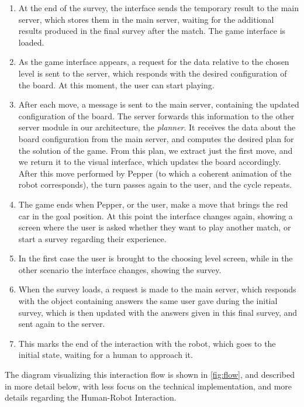 \documentclass{article}
\begin{document}
\begin{enumerate}
    \item At the end of the survey, the interface sends the temporary result to the main server, which stores them in the main server, waiting for the additional results produced in the final survey after the match. The game interface is loaded.
    \item As the game interface appears, a request for the data relative to the chosen level is sent to the server, which responds with the desired configuration of the board. At this moment, the user can start playing.
    \item After each move, a message is sent to the main server, containing the updated configuration of the board. The server forwards this information to the other server module in our architecture, the \textit{planner}. It receives the data about the board configuration from the main server, and computes the desired plan for the solution of the game. From this plan, we extract just the first move, and we return it to the visual interface, which updates the board accordingly. After this move performed by Pepper (to which a coherent animation of the robot corresponds), the turn passes again to the user, and the cycle repeats.
    \item The game ends when Pepper, or the user, make a move that brings the red car in the goal position. At this point the interface changes again, showing a screen where the user is asked whether they want to play another match, or start a survey regarding their experience.
    \item In the first case the user is brought to the choosing level screen, while in the other scenario the interface changes, showing the survey.
    \item When the survey loads, a request is made to the main server, which responds with the object containing answers the same user gave during the initial survey, which is then updated with the answers given in this final survey, and sent again to the server.
    \item This marks the end of the interaction with the robot, which goes to the initial state, waiting for a human to approach it.
\end{enumerate}

The diagram visualizing this interaction flow is shown in \ref{fig:flow}, and described in more detail below, with less focus on the technical implementation, and more details regarding the Human-Robot Interaction.
\end{document}
